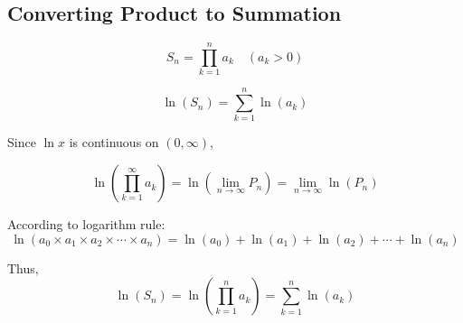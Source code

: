 \documentclass[12pt]{article}
\begin{document}
	\newpage

	\subsection*{Converting Product to Summation }
	$$
	S_n=\prod_{k=1}^{n} a_k \quad (a_k>0)
	$$
	
	$$
	\ln(S_n)=\sum_{k=1}^{n}\ln(a_k)
	$$
	
	Since \(\ln x\) is continuous on \((0,\infty)\),
	
	$$
	\ln\left(\prod_{k=1}^{\infty} a_k\right)
	=
	\ln\left(\lim_{n\to\infty}P_n\right)
	=
	\lim_{n\to\infty}\ln(P_n)
	$$
	
	According to logarithm rule:
	$$\ln(a_0\times a_1\times a_2\times \cdots\times a_n)=\ln(a_0)+\ln(a_1)+\ln(a_2)+\cdots+\ln(a_n)$$
	
	Thus, 
	$$
	\ln(S_n)=\ln\left(\prod_{k=1}^{n} a_k\right)=\sum_{k=1}^{n}\ln(a_k)
	$$
	
	
\end{document}

